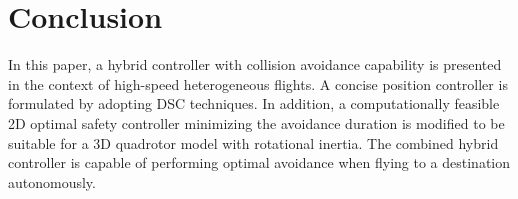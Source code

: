 \documentclass[journal,11pt,onecolumn,draftclsnofoot,]{IEEEtran}
\begin{document}

\section{\textbf{Conclusion}}

In this paper, a hybrid controller with collision avoidance capability is presented in the context of high-speed heterogeneous flights. A concise position controller is formulated by adopting DSC techniques. In addition, a computationally feasible 2D optimal safety controller minimizing the avoidance duration is modified to be suitable for a 3D quadrotor model with rotational inertia. The combined hybrid controller is capable of performing optimal avoidance when flying to a destination autonomously. 
\end{document}
